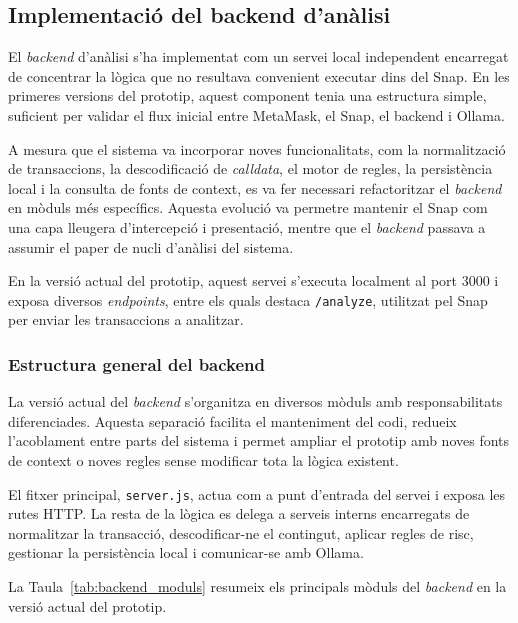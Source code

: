 
\subsection{Implementació del backend d’anàlisi}

El \textit{backend} d’anàlisi s’ha implementat com un servei local independent encarregat de concentrar la lògica que no resultava convenient executar dins del Snap. En les primeres versions del prototip, aquest component tenia una estructura simple, suficient per validar el flux inicial entre MetaMask, el Snap, el backend i Ollama. 

A mesura que el sistema va incorporar noves funcionalitats, com la normalització de transaccions, la descodificació de \textit{calldata}, el motor de regles, la persistència local i la consulta de fonts de context, es va fer necessari refactoritzar el \textit{backend} en mòduls més específics. Aquesta evolució va permetre mantenir el Snap com una capa lleugera d’intercepció i presentació, mentre que el \textit{backend} passava a assumir el paper de nucli d’anàlisi del sistema.

En la versió actual del prototip, aquest servei s’executa localment al port 3000 i exposa diversos \textit{endpoints}, entre els quals destaca \texttt{/analyze}, utilitzat pel Snap per enviar les transaccions a analitzar.


\subsubsection{Estructura general del backend}

La versió actual del \textit{backend} s’organitza en diversos mòduls amb responsabilitats diferenciades. Aquesta separació facilita el manteniment del codi, redueix l’acoblament entre parts del sistema i permet ampliar el prototip amb noves fonts de context o noves regles sense modificar tota la lògica existent.

El fitxer principal, \texttt{server.js}, actua com a punt d’entrada del servei i exposa les rutes HTTP. La resta de la lògica es delega a serveis interns encarregats de normalitzar la transacció, descodificar-ne el contingut, aplicar regles de risc, gestionar la persistència local i comunicar-se amb Ollama.

La Taula~\ref{tab:backend_moduls} resumeix els principals mòduls del \textit{backend} en la versió actual del prototip.

